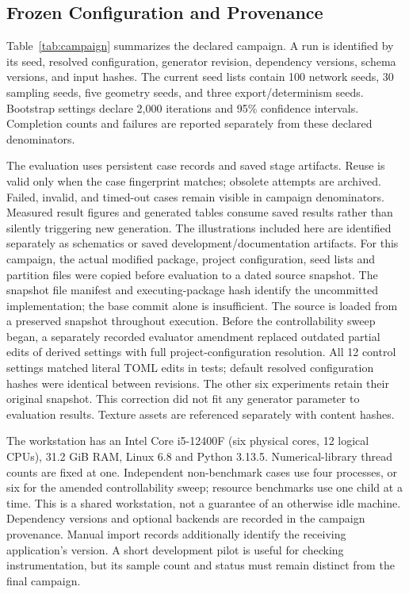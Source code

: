 \documentclass[conference]{IEEEtran}
\begin{document}
\subsection{Frozen Configuration and Provenance}
Table~\ref{tab:campaign} summarizes the declared campaign. A run is identified by its seed, resolved configuration, generator revision, dependency versions, schema versions, and input hashes. The current seed lists contain 100 network seeds, 30 sampling seeds, five geometry seeds, and three export/determinism seeds. Bootstrap settings declare 2,000 iterations and 95\% confidence intervals. Completion counts and failures are reported separately from these declared denominators.

The evaluation uses persistent case records and saved stage artifacts. Reuse is valid only when the case fingerprint matches; obsolete attempts are archived. Failed, invalid, and timed-out cases remain visible in campaign denominators. Measured result figures and generated tables consume saved results rather than silently triggering new generation. The illustrations included here are identified separately as schematics or saved development/documentation artifacts. For this campaign, the actual modified package, project configuration, seed lists and partition files were copied before evaluation to a dated source snapshot. The snapshot file manifest and executing-package hash identify the uncommitted implementation; the base commit alone is insufficient. The source is loaded from a preserved snapshot throughout execution. Before the controllability sweep began, a separately recorded evaluator amendment replaced outdated partial edits of derived settings with full project-configuration resolution. All 12 control settings matched literal TOML edits in tests; default resolved configuration hashes were identical between revisions. The other six experiments retain their original snapshot. This correction did not fit any generator parameter to evaluation results. Texture assets are referenced separately with content hashes.

The workstation has an Intel Core i5-12400F (six physical cores, 12 logical CPUs), 31.2 GiB RAM, Linux 6.8 and Python 3.13.5. Numerical-library thread counts are fixed at one. Independent non-benchmark cases use four processes, or six for the amended controllability sweep; resource benchmarks use one child at a time. This is a shared workstation, not a guarantee of an otherwise idle machine. Dependency versions and optional backends are recorded in the campaign provenance. Manual import records additionally identify the receiving application's version. A short development pilot is useful for checking instrumentation, but its sample count and status must remain distinct from the final campaign.
\end{document}
